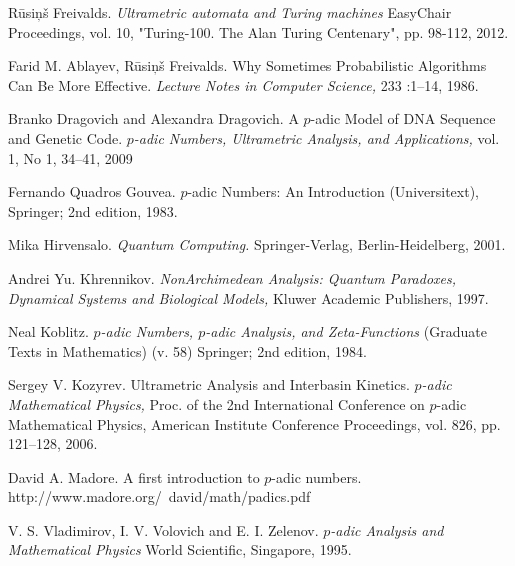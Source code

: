 \documentclass{llncs}
\begin{document}
\begin{thebibliography}{99}

R\= usi\c n\v s Freivalds.
{\em Ultrametric automata and Turing machines}
EasyChair Proceedings, vol. 10, "Turing-100. The Alan Turing Centenary", pp. 98-112, 2012.

Farid M. Ablayev, R\= usi\c n\v s Freivalds. 
Why Sometimes Probabilistic Algorithms Can Be More Effective. 
{\em Lecture Notes in Computer Science,} 233 :1--14, 1986.

Branko Dragovich and Alexandra Dragovich.
A $p$-adic Model
of DNA Sequence and Genetic Code.
{\em $p$-adic Numbers, Ultrametric Analysis, and Applications,}
vol. 1, No 1, 34--41, 2009

\iffalse

\bibitem{F99} %
R\= usi\c n\v s Freivalds.
How to Simulate Free Will in a Computational Device. 
{\em ACM Computing Surveys,} vol. 31, No. 3es, p. 15, 1999.


\bibitem{F91} %
R\= usi\c n\v s Freivalds.
Complexity of Probabilistic Versus Deterministic Automata. 
{\em Lecture Notes in Computer Science,} 502:565-613, 1991. 

\bibitem{FK94} %
R\= usi\c n\v s Freivalds, Marek Karpinski. 
Lower Space Bounds for Randomized Computation. 
{\em Lecture Notes in Computer Science,} 820:580-592, 1994. 

\fi


Fernando Quadros Gouvea.
$p$-adic Numbers: An Introduction (Universitext),
Springer; 2nd edition, 1983.


Mika Hirvensalo.
{\em Quantum Computing.} Springer-Verlag, Berlin-Heidelberg,  2001.

Andrei Yu. Khrennikov.
{\em NonArchimedean Analysis: Quantum Paradoxes, Dynamical Systems and
Biological Models,} Kluwer Academic Publishers, 1997.

Neal Koblitz.
{\em $p$-adic Numbers, $p$-adic Analysis, and Zeta-Functions} (Graduate Texts in Mathematics) (v. 58)
Springer; 2nd edition, 1984.

Sergey V. Kozyrev. 
Ultrametric Analysis and Interbasin Kinetics.
{\em $p$-adic Mathematical Physics,} Proc. of the 2nd International Conference on $p$-adic 
Mathematical Physics, American Institute Conference Proceedings,
vol. 826, pp. 121--128, 2006.

David A. Madore.
A first introduction to $p$-adic numbers.
http://www.madore.org/~david/math/padics.pdf 

V. S. Vladimirov, I. V. Volovich and E. I. Zelenov.
{\em $p$-adic Analysis and Mathematical Physics} 
World Scientific, Singapore, 1995. 

\end{thebibliography}
\end{document}
